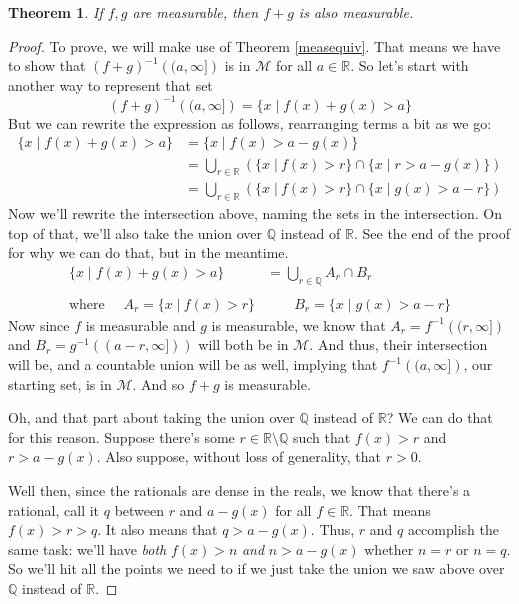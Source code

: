 \documentclass[12pt]{article}
\theoremstyle{plain}
\newtheorem{thm}{Theorem}[subsection]
\theoremstyle{definition}
\theoremstyle{remark}
\begin{document}
\begin{thm}
    \label{summeas}
If $f, g$ are measurable, then $f+g$ is also measurable.
\end{thm}
\begin{proof}
To prove, we will make use of Theorem \ref{measequiv}. That means we have to show that $(f+g)^{-1}\left( (a, \infty]\right)$ is in $\mathscr{M}$ for all $a\in\mathbb{R}$. So let's start with another way to represent that set
\[
    (f+g)^{-1}\left( (a, \infty]\right)
    =\{x \; | \; f(x) + g(x) > a\} 
\]
But we can rewrite the expression as follows, rearranging terms a bit as we go:
\begin{align*}
    \{x \; | \; f(x) + g(x) > a\} &= 
        \{x \; | \; f(x) > a - g(x) \}  \\
    &= \bigcup_{r\in \mathbb{R}} 
        \left( \{ x \; | \: f(x) > r\}
        \cap \{ x \; | \; r > a - g(x) \}
        \right) \\
    &= \bigcup_{r\in \mathbb{R}} 
        \left( \{ x \; | \: f(x) > r\}
        \cap \{ x \; | \; g(x) > a - r \}
        \right) 
\end{align*}
Now we'll rewrite the intersection above, naming the sets in the intersection. On top of that, we'll also take the union over $\mathbb{Q}$ instead of $\mathbb{R}$. See the end of the proof for why we can do that, but in the meantime.
\begin{align*}
    \{x \; | \; f(x) + g(x) > a\} 
    &= \bigcup_{r\in \mathbb{Q}} 
        A_r \cap B_r  \\\\
    \text{where } \quad 
        A_r = \{ x \; | \: f(x) > r\} &\qquad
        B_r = \{ x \; | \; g(x) > a - r \}
\end{align*}
Now since $f$ is measurable and $g$ is measurable, we know that $A_r = f^{-1}\left( (r, \infty]\right)$ and $B_r = g^{-1}\left( (a-r, \infty])\right)$ will both be in $\mathscr{M}$. And thus, their intersection will be, and a countable union will be as well, implying that $f^{-1}\left( (a,\infty]\right)$, our starting set, is in $\mathscr{M}$. And so $f+g$ is measurable.

Oh, and that part about taking the union over $\mathbb{Q}$ instead of $\mathbb{R}$? We can do that for this reason. Suppose there's some $r \in \mathbb{R} \setminus \mathbb{Q}$ such that $f(x)>r$ and $r>a-g(x)$. Also suppose, without loss of generality, that $r>0$. 

Well then, since the rationals are dense in the reals, we know that there's a rational, call it $q$ between $r$ and $a-g(x)$ for all $f\in\mathbb{R}$. That means $f(x)>r>q$. It also means that $q>a-g(x)$. Thus, $r$ and $q$ accomplish the same task: we'll have \emph{both} $f(x)>n$ \emph{and} $n>a-g(x)$ whether $n=r$ or $n=q$. So we'll hit all the points we need to if we just take the union we saw above over $\mathbb{Q}$ instead of $\mathbb{R}$.
\end{proof}
\end{document}
